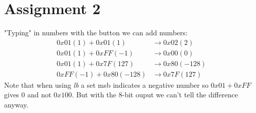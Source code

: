 \section{Assignment 2}
"Typing" in numbers with the button we can add numbers:
\begin{align}
0x01 (1) + 0x01 (1) &\rightarrow 0x02 (2)\label{eq:per1}\\
0x01 (1) + 0xFF (-1) &\rightarrow 0x00 (0)\label{eq:per2}\\
0x01 (1) + 0x7F (127) &\rightarrow 0x80 (-128)\label{eq:per3}\\
0xFF (-1) + 0x80 (-128) &\rightarrow 0x7F (127)\label{eq:per4}
\end{align}
Note that when using \emph{lb} a set msb indicates a negative number so $0x01 +
0xFF$ gives $0$ and not $0x100$. But with the 8-bit ouput we can't tell the
difference anyway.


